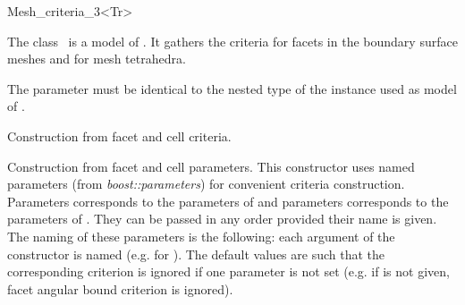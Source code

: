 \ccRefPageBegin


\begin{ccRefClass}{Mesh_criteria_3<Tr>}  %


\ccDefinition
  
The class \ccRefName\ is a model of . 
It gathers the criteria for  facets in the boundary surface meshes
and for mesh tetrahedra.


\ccParameters
The parameter  must be identical to the nested type
 of the instance used as model of
.

\ccIsModel
{}


\ccTypes

\ccGlue
{}


\ccCreation
{}  %

{Construction from facet and cell criteria.}

{Construction from facet and cell parameters. This constructor uses named
  parameters (from \emph{boost::parameters}) for convenient criteria
  construction. Parameters  corresponds to the parameters of
   and parameters  corresponds to the parameters of
  . They can be passed in any order provided
  their name is given. The naming of these parameters
  is the following: each argument  of the
  constructor is named  
 (e.g.  for ). The
 default values are such that the corresponding criterion is
 ignored if one parameter is not set (e.g. if  is
 not given, facet angular bound criterion is ignored).}



\end{ccRefClass}
